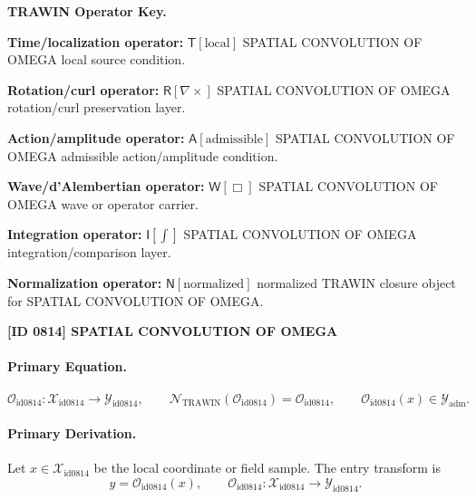 \par\vspace{0.45\baselineskip}
\noindent\begin{minipage}[t]{\linewidth}
\begingroup
\small
\raggedright
\textbf{TRAWIN Operator Key.}\par
\noindent\textbf{Time/localization operator:} $\mathsf{T}\!\left[\mathrm{local}\right]$ SPATIAL CONVOLUTION OF OMEGA local source condition.\par
\noindent\textbf{Rotation/curl operator:} $\mathsf{R}\!\left[\nabla\times\right]$ SPATIAL CONVOLUTION OF OMEGA rotation/curl preservation layer.\par
\noindent\textbf{Action/amplitude operator:} $\mathsf{A}\!\left[\mathrm{admissible}\right]$ SPATIAL CONVOLUTION OF OMEGA admissible action/amplitude condition.\par
\noindent\textbf{Wave/d'Alembertian operator:} $\mathsf{W}\!\left[\Box\right]$ SPATIAL CONVOLUTION OF OMEGA wave or operator carrier.\par
\noindent\textbf{Integration operator:} $\mathsf{I}\!\left[\int\right]$ SPATIAL CONVOLUTION OF OMEGA integration/comparison layer.\par
\noindent\textbf{Normalization operator:} $\mathsf{N}\!\left[\mathrm{normalized}\right]$ normalized TRAWIN closure object for SPATIAL CONVOLUTION OF OMEGA.\par
\endgroup
\end{minipage}

\clearpage
\noindent\textbf{[ID 0814] SPATIAL CONVOLUTION OF OMEGA}\par
\vspace{0.35em}
\paragraph{Primary Equation.}
\[
\mathcal{O}_{\mathrm{id0814}}:\mathcal{X}_{\mathrm{id0814}}\longrightarrow \mathcal{Y}_{\mathrm{id0814}},\qquad
\mathcal{N}_{\mathrm{TRAWIN}}(\mathcal{O}_{\mathrm{id0814}})=\mathcal{O}_{\mathrm{id0814}},\qquad
\mathcal{O}_{\mathrm{id0814}}(x)\in\mathcal{Y}_{\mathrm{adm}}.
\]

\paragraph{Primary Derivation.} Let $x\in \mathcal{X}_{\mathrm{id0814}}$ be the local coordinate or field sample.  The entry transform is\[
y=\mathcal{O}_{\mathrm{id0814}}(x),\qquad \mathcal{O}_{\mathrm{id0814}}:\mathcal{X}_{\mathrm{id0814}}\longrightarrow \mathcal{Y}_{\mathrm{id0814}}.
\]

